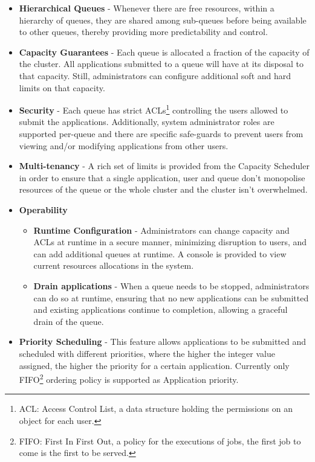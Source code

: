 \begin{itemize}

\item \textbf{Hierarchical Queues} - Whenever there are free resources, within a hierarchy of queues, they are shared among sub-queues before being available to other queues, thereby providing more predictability and control. 

\item \textbf{Capacity Guarantees} - Each queue is allocated a fraction of the capacity of the cluster. All applications submitted to a queue will have at its disposal to that capacity. Still, administrators can configure additional soft and hard limits on that capacity. 

\item \textbf{Security} - Each queue has strict ACLs\footnote{ACL: Access Control List, a data structure holding the permissions on an object for each user.} controlling the users allowed to submit the applications. Additionally, system administrator roles are supported per-queue and there are specific safe-guards to prevent users from viewing and/or modifying applications from other users.

\item \textbf{Multi-tenancy} - 
A rich set of limits is provided from the Capacity Scheduler in order to ensure that a single application, user and queue don't monopolise resources of the queue or the whole cluster and the cluster isn't overwhelmed.

\item \textbf{Operability}
    \begin{itemize}
    \item \textbf{Runtime Configuration} - Administrators can change capacity and ACLs at runtime in a secure manner, minimizing disruption to users, and can add additional queues at runtime. A console is provided to view current resources allocations in the system.
    
    \item \textbf{Drain applications} - When a queue needs to be stopped, administrators can do so at runtime, ensuring that no new applications can be submitted and existing applications continue to completion, allowing a graceful drain of the queue.
    \end{itemize}

\item \textbf{Priority Scheduling} - This feature allows applications to be submitted and scheduled with different priorities, where the higher the integer value assigned, the higher the priority for a certain application. Currently only FIFO\footnote{FIFO: First In First Out, a policy for the executions of jobs, the first job to come is the first to be served.} ordering policy is supported as Application priority.

\end{itemize}

